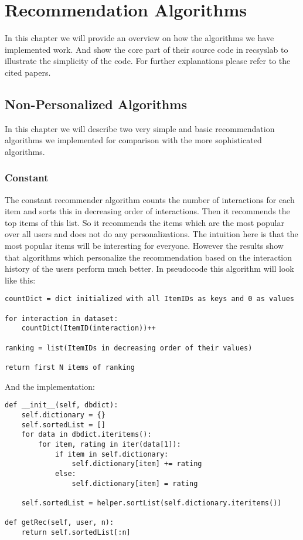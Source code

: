 
\chapter{Recommendation Algorithms}
\label{recommendationalgorithms}
In this chapter we will provide an overview on how the algorithms we have implemented
work. And show the core part of their source code in recsyslab to illustrate the 
simplicity of the code. For further explanations please refer to the cited papers.


\section{Non-Personalized Algorithms}

In this chapter we will describe two very simple and basic recommendation
algorithms we implemented for comparison with the more sophisticated
algorithms.


\subsection{Constant}

The constant recommender algorithm counts the number of interactions
for each item and sorts this in decreasing order of interactions.
Then it recommends the top items of this list. So it recommends the
items which are the most popular over all users and does not do any
personalizations. The intuition here is that the most popular items
will be interesting for everyone. However the results show that
algorithms which personalize the recommendation based on the 
interaction history of the users perform much better.
In pseudocode this algorithm will look like this:
\begin{lstlisting}
countDict = dict initialized with all ItemIDs as keys and 0 as values

for interaction in dataset:
    countDict(ItemID(interaction))++

ranking = list(ItemIDs in decreasing order of their values)

return first N items of ranking
\end{lstlisting}
And the implementation:
\begin{lstlisting}
def __init__(self, dbdict):
    self.dictionary = {}
    self.sortedList = []
    for data in dbdict.iteritems():
        for item, rating in iter(data[1]):
            if item in self.dictionary:
                self.dictionary[item] += rating
            else:
                self.dictionary[item] = rating

    self.sortedList = helper.sortList(self.dictionary.iteritems())

def getRec(self, user, n):
    return self.sortedList[:n]
\end{lstlisting}



